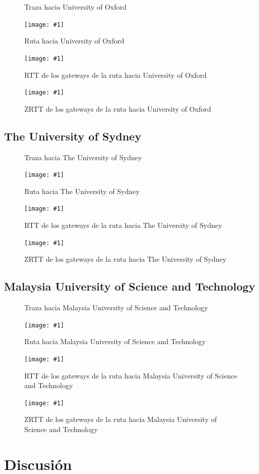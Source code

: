 \documentclass[a4paper, 10pt, twoside]{article}
\newcommand{\estadisticas}[3]{
  \begin{figure}[H]
    \small
    
    \normalsize
    \caption{#2}
    \label{#3}
  \end{figure}
}
\newcommand{\grafico}[3]{
  \begin{figure}[H]
    \texttt{[image: \#1]}
    \caption{#2}
    \label{#3}
  \end{figure}
}
\newcommand{\oxford}{University of Oxford}
\newcommand{\sydney}{The University of Sydney}
\newcommand{\must}{Malaysia University of Science and Technology}
\begin{document}
\estadisticas{statistics-www.ox.ac.uk.txt}
             {Traza hacia \oxford}
             {fig:trace-oxford}

\grafico{map-www.ox.ac.uk}
        {Ruta hacia \oxford}
        {fig:map-oxford}

\grafico{rtt-www.ox.ac.uk}
        {RTT de los gateways de la ruta hacia \oxford}
        {fig:rtt-oxford}

\grafico{zrtt-www.ox.ac.uk}
        {ZRTT de los gateways de la ruta hacia \oxford}
        {fig:zrtt-oxford}


\subsection{\sydney}

\estadisticas{statistics-www.sydney.edu.au.txt}
             {Traza hacia \sydney}
             {fig:trace-sydney}

\grafico{map-www.sydney.edu.au}
        {Ruta hacia \sydney}
        {fig:map-sydney}

\grafico{rtt-www.sydney.edu.au}
        {RTT de los gateways de la ruta hacia \sydney}
        {fig:rtt-sydney}

\grafico{zrtt-www.sydney.edu.au}
        {ZRTT de los gateways de la ruta hacia \sydney}
        {fig:zrtt-sydney}


\subsection{\must}

\estadisticas{statistics-www.must.edu.my.txt}
             {Traza hacia \must}
             {fig:trace-must}

\grafico{map-www.must.edu.my}
        {Ruta hacia \must}
        {fig:map-must}

\grafico{rtt-www.must.edu.my}
        {RTT de los gateways de la ruta hacia \must}
        {fig:rtt-must}

\grafico{zrtt-www.must.edu.my}
        {ZRTT de los gateways de la ruta hacia \must}
        {fig:zrtt-must}




\section{Discusión}
\label{sec:discusion}
\end{document}
